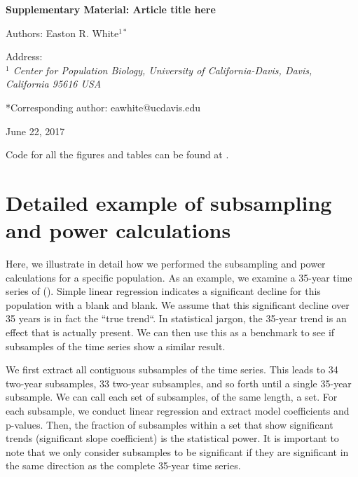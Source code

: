 \documentclass[12pt,]{article}
\title{}
\author{}
\date{}
\begin{document}
\vspace{2cm}

\begin{center}
 \textbf{Supplementary Material: Article title here}
 
Authors: Easton R. White$^{1*}$
\vspace{3 mm}

Address: \\ \emph{$^1$ Center for Population Biology, University of California-Davis, Davis, California 95616 USA}

*Corresponding author: eawhite@ucdavis.edu

June 22, 2017
 \end{center}

\vspace{2cm}

\tableofcontents

Code for all the figures and tables can be found at
\href{https://github.com/erwhite1}{}.

\vspace{2cm}

\section{Detailed example of subsampling and power
calculations}\label{detailed-example-of-subsampling-and-power-calculations}

Here, we illustrate in detail how we performed the subsampling and power
calculations for a specific population. As an example, we examine a
35-year time series of (). Simple linear regression indicates a
significant decline for this population with a blank and blank. We
assume that this significant decline over 35 years is in fact the ``true
trend``. In statistical jargon, the 35-year trend is an effect that is
actually present. We can then use this as a benchmark to see if
subsamples of the time series show a similar result.

We first extract all contiguous subsamples of the time series. This
leads to 34 two-year subsamples, 33 two-year subsamples, and so forth
until a single 35-year subsample. We can call each set of subsamples, of
the same length, a set. For each subsample, we conduct linear regression
and extract model coefficients and p-values. Then, the fraction of
subsamples within a set that show significant trends (significant slope
coefficient) is the statistical power. It is important to note that we
only consider subsamples to be significant if they are significant in
the same direction as the complete 35-year time series.
\end{document}

